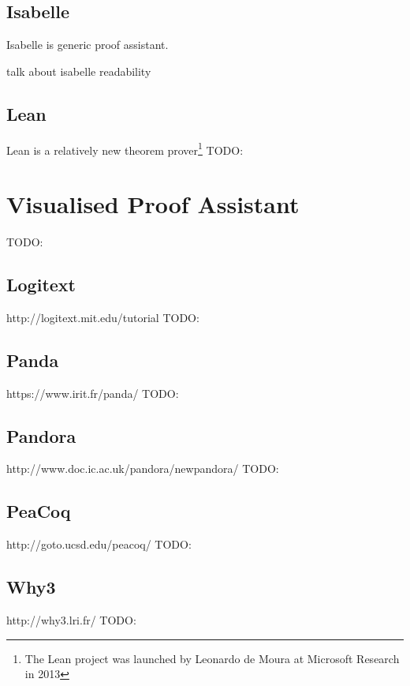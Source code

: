 \documentclass[master.tex]{subfiles}
\begin{document}
\subsection{Isabelle}

Isabelle\supercite{isabelle-official-website} is generic proof assistant.



talk about isabelle readability

\subsection{Lean}
Lean\supercite{lean-offical-website} is a relatively new theorem
prover\footnote{The Lean project was launched by Leonardo de Moura at Microsoft
  Research in 2013} TODO:

\section{Visualised Proof Assistant}
TODO:

\subsection{Logitext}
http://logitext.mit.edu/tutorial
TODO:

\subsection{Panda}
https://www.irit.fr/panda/
TODO:

\subsection{Pandora}
http://www.doc.ic.ac.uk/pandora/newpandora/
TODO:

\subsection{PeaCoq}
http://goto.ucsd.edu/peacoq/
TODO:

\subsection{Why3}
http://why3.lri.fr/
TODO:
\end{document}
